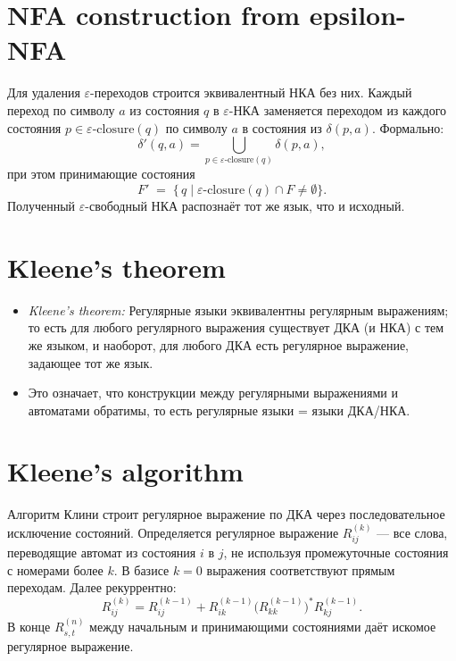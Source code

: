 \documentclass{article}
\begin{document}
	\section{NFA construction from epsilon-NFA}
	Для удаления $\varepsilon$-переходов строится эквивалентный НКА без них. Каждый переход по символу $a$ из состояния $q$ в $\varepsilon$-НКА заменяется переходом из каждого состояния $p\in\varepsilon\text{-closure}(q)$ по символу $a$ в состояния из $\delta(p,a)$. Формально: 
	\[
	\delta'(q,a) = \bigcup_{p\in\varepsilon\text{-closure}(q)}\delta(p,a),
	\]
	при этом принимающие состояния 
	\[
	F' \;=\; \{\,q \mid \varepsilon\text{-closure}(q)\cap F\neq\emptyset\}.
	\]
	Полученный $\varepsilon$-свободный НКА распознаёт тот же язык, что и исходный.
	
	\section{Kleene’s theorem}
	\begin{itemize}
		\item \textit{Kleene’s theorem:} Регулярные языки эквивалентны регулярным выражениям; то есть для любого регулярного выражения существует ДКА (и НКА) с тем же языком, и наоборот, для любого ДКА есть регулярное выражение, задающее тот же язык.
		\item Это означает, что конструкции между регулярными выражениями и автоматами обратимы, то есть регулярные языки = языки ДКА/НКА.
	\end{itemize}
	
	\section{Kleene’s algorithm}
	Алгоритм Клини строит регулярное выражение по ДКА через последовательное исключение состояний. Определяется регулярное выражение $R_{ij}^{(k)}$ --- все слова, переводящие автомат из состояния $i$ в $j$, не используя промежуточные состояния с номерами более $k$. В базисе $k=0$ выражения соответствуют прямым переходам. Далее рекуррентно:
	\[
	R_{ij}^{(k)} = R_{ij}^{(k-1)} + R_{ik}^{(k-1)} \bigl(R_{kk}^{(k-1)}\bigr)^* R_{kj}^{(k-1)}.
	\]
	В конце $R_{s,t}^{(n)}$ между начальным и принимающими состояниями даёт искомое регулярное выражение.
	
\end{document}
